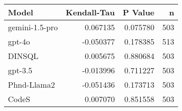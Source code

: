 \begin{tabular}{lrrr}
\toprule
Model & Kendall-Tau & P Value & n \\
\midrule
gemini-1.5-pro & 0.067135 & 0.075780 & 503 \\
gpt-4o & -0.050377 & 0.178385 & 513 \\
DINSQL & 0.005675 & 0.880684 & 503 \\
gpt-3.5 & -0.013996 & 0.711227 & 503 \\
Phnd-Llama2 & -0.051436 & 0.173713 & 503 \\
CodeS & 0.007070 & 0.851558 & 503 \\
\bottomrule
\end{tabular}
